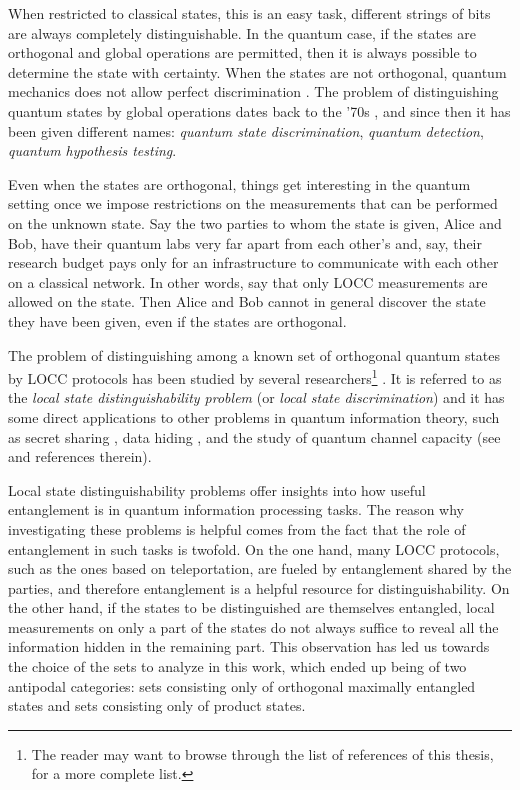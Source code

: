When restricted to classical states, this is an easy task, 
different strings of bits are always completely distinguishable. 
In the quantum case, if the states are orthogonal and global operations 
are permitted, then it is always possible to determine the state
with certainty.
When the states are not orthogonal, quantum mechanics does not allow 
perfect discrimination \cite{Nielsen11}.
The problem of distinguishing quantum states by global operations 
dates back to the '70s \cite{Helstrom1969},
and since then it has been given different names: \emph{quantum state discrimination}, 
\emph{quantum detection}, \emph{quantum hypothesis testing}.


Even when the states are orthogonal, things get interesting in the quantum setting 
once we impose 
restrictions on the measurements that can be performed on the unknown state.
Say the two parties to whom the state is given, Alice and Bob,
have their quantum labs very far apart from each other's and, say, their research budget 
pays only for an infrastructure to communicate with each other on a classical network.
In other words, say that only LOCC measurements are allowed on the state. 
Then Alice and Bob cannot in general discover the state they have been given, 
even if the states are orthogonal.

The problem of distinguishing among a known set 
of orthogonal quantum states by LOCC protocols has been studied by several researchers\footnote{The reader may want to browse through the list of references of this thesis, for a more complete list.}
\cite{Bennett99,Walgate00,Ghosh01,Horodecki03,Fan04,Ghosh04,Nathanson05,Watrous05,Yu11,Yu12}.
It is referred to as the \emph{local state distinguishability problem} (or 
\emph{local state discrimination}) and it has some direct applications 
to other problems in quantum information theory, 
such as secret sharing \cite{Cleve99,Gottesman00}, 
data hiding \cite{Terhal01a,DiVincenzo2002}, and the study of quantum channel 
capacity (see \cite{Watrous05,Yu11} and references therein).

Local state distinguishability problems offer insights into how useful entanglement 
is in quantum information processing tasks.
The reason why investigating these problems is helpful comes from the fact that the role of entanglement 
in such tasks is twofold. On the one hand, many LOCC protocols, such as the ones based on teleportation, 
are fueled by entanglement shared by the parties, and therefore entanglement is a helpful resource
for distinguishability. 
On the other hand, if the states to be distinguished are themselves entangled,
local measurements on only a part of the states do not always suffice to reveal 
all the information hidden in the remaining part.
This observation has led us towards the choice of the sets to analyze in this work, 
which ended up being of two antipodal categories: sets consisting only of orthogonal maximally entangled states
and sets consisting only of product states.

